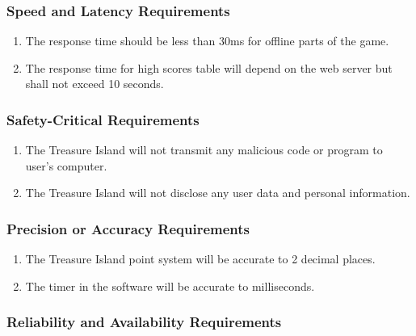 \documentclass[]{article}
\begin{document}
\subsubsection{Speed and Latency Requirements}
\label{ssub:speed_and_latency_requirements}
\begin{enumerate}[{PR}1. ]
	\item The response time should be less than 30ms for offline parts of the game.
	\item The response time for high scores table will depend on the web server but shall not exceed 10 seconds.
\end{enumerate}


\subsubsection{Safety-Critical Requirements}
\label{ssub:safety_critical_requirements}

\begin{enumerate}[{PR}1. ]
	\item The Treasure Island will not transmit any malicious code or program to user's computer.
	\item The Treasure Island will not disclose any user data and personal information.
\end{enumerate}


\subsubsection{Precision or Accuracy Requirements}
\label{ssub:precision_or_accuracy_requirements}

\begin{enumerate}[{PR}1. ]
	\item The Treasure Island point system will be accurate to 2 decimal places.
	\item The timer in the software will be accurate to milliseconds.
\end{enumerate}


\subsubsection{Reliability and Availability Requirements}
\label{ssub:reliability_and_availability_requirements}
\end{document}
